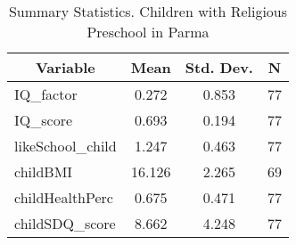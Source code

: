 
\begin{table}[htbp]\centering \caption{Summary Statistics. Children with Religious Preschool in Parma \label{bothChildmaternaReliParma}}
\begin{tabular}{l c c  c}\hline\hline
\multicolumn{1}{c}{\textbf{Variable}} & \textbf{Mean}
 & \textbf{Std. Dev.} & \textbf{N}\\ \hline
IQ\_factor & 0.272 & 0.853  & 77\\
IQ\_score & 0.693 & 0.194  & 77\\
likeSchool\_child & 1.247 & 0.463  & 77\\
childBMI & 16.126 & 2.265  & 69\\
childHealthPerc & 0.675 & 0.471  & 77\\
childSDQ\_score & 8.662 & 4.248  & 77\\
\hline\end{tabular}
\end{table}
